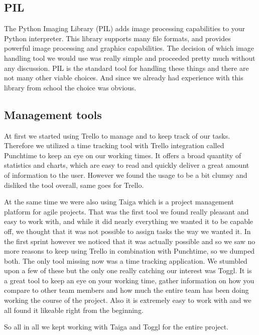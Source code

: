 \subsection{PIL}
The Python Imaging Library (PIL) adds image processing capabilities to your Python interpreter. This library supports many file formats, and provides powerful image processing and graphics capabilities. The decision of which image handling tool we would use was really simple and proceeded pretty much without any discussion. PIL is the standard tool for handling these things and there are not many other viable choices. And since we already had experience with this library from school the choice was obvious.

\subsection{Management tools}
At first we started using Trello to manage and to keep track of our tasks. Therefore we  utilized a time tracking tool with Trello integration called Punchtime to keep an eye on our working times. It offers a broad quantity of statistics and charts, which are easy to read and quickly deliver a great amount of information to the user. However we found the usage to be a bit clumsy and disliked the tool overall, same goes for Trello.

At the same time we were also using Taiga which is a project management platform for agile projects. That was the first tool we found really pleasant and easy to work with, and while it did nearly everything we wanted it to be capable off, we thought that it was not possible to assign tasks the way we wanted it. In the first sprint however we noticed that it was actually possible and so we saw no more reasons to keep using Trello in combination with Punchtime, so we dumped both. The only tool missing now was a time tracking application. We stumbled upon a few of these but the only one really catching our interest was Toggl. It is a great tool to keep an eye on your working time, gather information on how you compare to other team members and how much the entire team has been doing working the course of the project. Also it is extremely easy to work with and we all found it likeable right from the beginning.

So all in all we kept working with Taiga and Toggl for the entire project.


